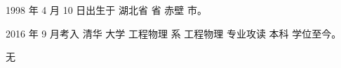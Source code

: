 \begin{resume}


  1998 年 4 月 10 日出生于 湖北省 省 赤壁 市。

  2016 年 9 月考入 清华 大学 工程物理 系 工程物理 专业攻读 本科 学位至今。%



  无




\end{resume}
